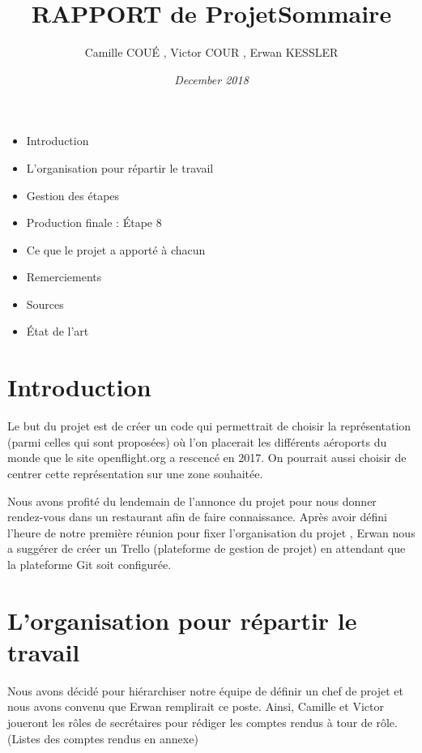 \documentclass{article}
\title{\bf RAPPORT de Projet}
\author{ Camille COUÉ , Victor COUR , Erwan KESSLER}
\date{\it December 2018}
\begin{document}
\maketitle


\title{\bf \Large Sommaire}
\begin{itemize}
    \item Introduction
    \item L'organisation pour répartir le travail 
    \item Gestion des étapes
    \item Production finale : Étape 8
    \item Ce que le projet a apporté à chacun
    \item Remerciements
    \item Sources
    \item État de l'art
\end{itemize}
\section { Introduction }



Le but du projet est de créer un code qui permettrait de choisir la représentation (parmi celles qui sont proposées) où l’on placerait les différents aéroports du monde que le site openflight.org a rescencé en 2017. On pourrait aussi choisir de centrer cette représentation sur une zone souhaitée.

\vspace{1\baselineskip}

Nous avons profité du lendemain de l’annonce du projet pour nous donner rendez-vous dans un restaurant afin de faire connaissance. Après avoir défini l’heure de notre première réunion pour fixer l’organisation du projet , Erwan nous a suggérer de créer un Trello (plateforme de gestion de projet) en attendant que la plateforme Git soit configurée.

\vspace{1\baselineskip}


\section{ L'organisation pour répartir le travail }


Nous avons décidé pour hiérarchiser notre équipe de définir un chef de projet et nous avons convenu que Erwan remplirait ce poste.
Ainsi, Camille et Victor joueront les rôles de secrétaires pour rédiger les comptes rendus à tour de rôle. (Listes des comptes rendus en annexe)
\end{document}
